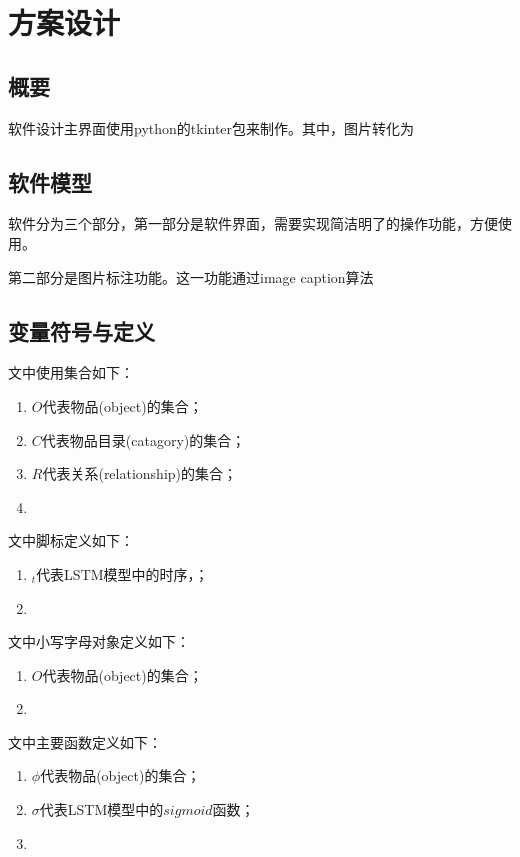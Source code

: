 
\chapter{方案设计}

\section{概要}
软件设计主界面使用python的tkinter包来制作。其中，图片转化为

\section{软件模型}
软件分为三个部分，第一部分是软件界面，需要实现简洁明了的操作功能，方便使用。

第二部分是图片标注功能。这一功能通过image caption算法

\section{变量符号与定义}
文中使用集合如下：
\begin{enumerate}[fullwidth,itemindent=2em,label=\arabic*.]
    \item $O$代表物品(object)的集合；
    \item $C$代表物品目录(catagory)的集合；
    \item $R$代表关系(relationship)的集合；
    \item 
\end{enumerate}

文中脚标定义如下：
\begin{enumerate}[fullwidth,itemindent=2em,label=\arabic*.]
    \item ${}_t$代表LSTM模型中的时序，；
    \item 
\end{enumerate}

文中小写字母对象定义如下：
\begin{enumerate}[fullwidth,itemindent=2em,label=\arabic*.]
    \item $O$代表物品(object)的集合；
    \item 
\end{enumerate}

文中主要函数定义如下：
\begin{enumerate}[fullwidth,itemindent=2em,label=\arabic*.]
    \item $\phi$代表物品(object)的集合；
    \item $\sigma$代表LSTM模型中的$sigmoid$函数；
    \item 
\end{enumerate}

